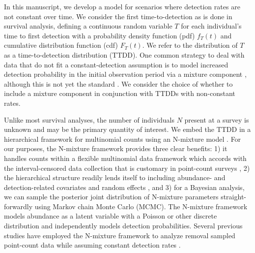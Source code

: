 \documentclass[12pt]{article}
\begin{document}
In this manuscript, we develop a model for scenarios where detection rates are not constant over time. 
We consider the first time-to-detection as is done in survival analysis, defining a continuous random variable $T$ for each individual's time to first detection with a probability density function (pdf) $f_T(t)$ and cumulative distribution function (cdf) $F_T(t)$.  
We refer to the distribution of $T$ as a time-to-detection distribution (TTDD).  
One common strategy to deal with data that do not fit a constant-detection assumption is to model increased detection probability in the initial observation period via a mixture component \citep{Farnsworth2002, Farnsworth2005, EffordDawson2009, Etterson2009, Reidy2011}, although this is not yet the standard \citep{Solymos2013, Amundson2014, Reidy2016}. 
We consider the choice of whether to include a mixture component in conjunction with TTDDs with non-constant rates.

Unlike most survival analyses, the number of individuals $N$ present at a survey is unknown and may be the primary quantity of interest.  
We embed the TTDD in a hierarchical framework for multinomial counts using an N-mixture model \citep{Wyatt2002, Royle2004NMixture}.  
For our purposes, the N-mixture framework provides three clear benefits: 1) it handles counts within a flexible multinomial data framework \citep{RoyleDorazio2006} which accords with the interval-censored data collection that is customary in point-count surveys \citep{Ralph1995}, 2) the hierarchical structure readily lends itself to including abundance- and detection-related covariates and random effects \citep{Dorazio2005, Etterson2009, Amundson2014}, and 3) for a Bayesian analysis, we can sample the posterior joint distribution of N-mixture parameters straight-forwardly using Markov chain Monte Carlo (MCMC).  
The N-mixture framework models abundance as a latent variable with a Poisson or other discrete distribution and independently models detection probabilities.  
Several previous studies have employed the N-mixture framework to analyze removal sampled point-count data while assuming constant detection rates \citep{Royle2004Generalized, Dorazio2005, Etterson2009, Solymos2013, Amundson2014, Reidy2016}.  



\end{document}
